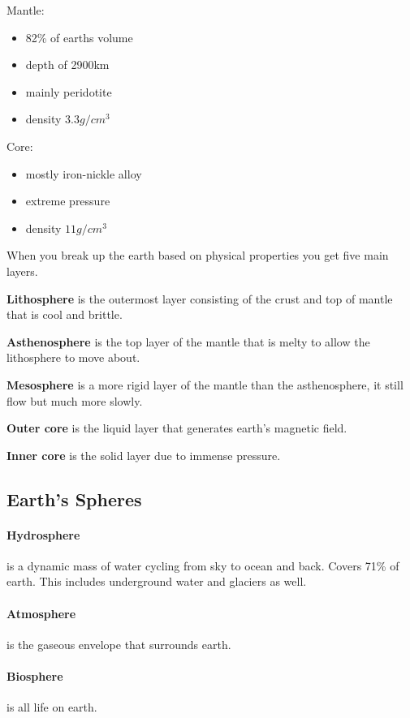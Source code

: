 \documentclass{article}
\begin{document}
Mantle:
\begin{itemize}
    \item 82\% of earths volume
    \item depth of 2900km
    \item mainly peridotite
    \item density $3.3g/cm^3$
\end{itemize}

Core:
\begin{itemize}
    \item mostly iron-nickle alloy
    \item extreme pressure
    \item density $11g/cm^3$
\end{itemize}

When you break up the earth based on physical properties you get five main layers.

\textbf{Lithosphere} is the outermost layer consisting of the crust and top of mantle that is cool and brittle.

\textbf{Asthenosphere} is the top layer of the mantle that is melty to allow the lithosphere to move about.

\textbf{Mesosphere} is a more rigid layer of the mantle than the asthenosphere, it still flow but much more slowly.

\textbf{Outer core} is the liquid layer that generates earth's magnetic field.

\textbf{Inner core} is the solid layer due to immense pressure.

\subsection*{Earth's Spheres} %
\label{sub:earth_s_spheres}

\paragraph{Hydrosphere} is a dynamic mass of water cycling from sky to ocean and back. Covers 71\% of earth. This includes underground water and glaciers as well.

\paragraph{Atmosphere} is the gaseous envelope that surrounds earth.

\paragraph{Biosphere} is all life on earth.
\end{document}
